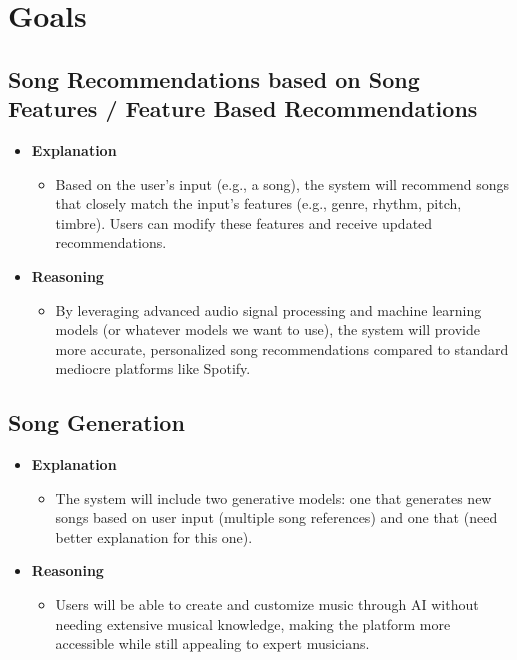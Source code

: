 \documentclass{article}
\begin{document}
\section{Goals}
\subsection*{Song Recommendations based on Song Features / Feature Based Recommendations}
\begin{itemize}
    \item \textbf{Explanation}
    \begin{itemize}
        \item Based on the user’s input (e.g., a song), the system will recommend songs that closely match the input's features (e.g., genre, rhythm, pitch, timbre). Users can modify these features and receive updated recommendations.
    \end{itemize}
    \item \textbf{Reasoning}
    \begin{itemize}
        \item By leveraging advanced audio signal processing and machine learning models (or whatever models we want to use), the system will provide more accurate, personalized song recommendations compared to standard mediocre platforms like Spotify.
    \end{itemize}
\end{itemize}

\subsection*{Song Generation}
\begin{itemize}
    \item \textbf{Explanation}
    \begin{itemize}
        \item The system will include two generative models: one that generates new songs based on user input (multiple song references) and one that (need better explanation for this one).
    \end{itemize}
    \item \textbf{Reasoning}
    \begin{itemize}
        \item Users will be able to create and customize music through AI without needing extensive musical knowledge, making the platform more accessible while still appealing to expert musicians.
    \end{itemize}
\end{itemize}
\end{document}
